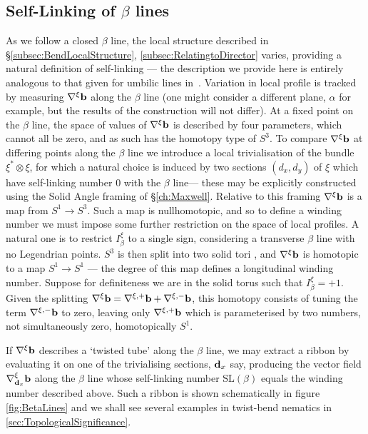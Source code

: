 {\subsection{Self-Linking of $\beta$ lines}
\label{subsec:Self-Linking}
As we follow a closed $\beta$ line, the local structure described in \S\ref{subsec:BendLocalStructure}, \ref{subsec:RelatingtoDirector} varies, providing a natural definition of self-linking --- the description we provide here is entirely analogous to that given for umbilic lines in~\citep{Machon2016b}. Variation in local profile is tracked by measuring $\nabla^\xi \mathbf{b}$ along the $\beta$ line (one might consider a different plane, $\alpha$ for example, but the results of the construction will not differ). At a fixed point on the $\beta$ line, the space of values of $\nabla^\xi \mathbf{b}$ is described by four parameters, which cannot all be zero, and as such has the homotopy type of $S^3$. To compare $\nabla^\xi \mathbf{b}$ at differing points along the $\beta$ line we introduce a local trivialisation of the bundle $\xi^*\otimes\xi$, for which a natural choice is induced by two sections $(d_x,d_y)$ of $\xi$ which have self-linking number $0$ with the $\beta$ line--- these may be explicitly constructed using the Solid Angle framing of \S\ref{ch:Maxwell}. Relative to this framing $\nabla^\xi \mathbf{b}$ is a map from $S^1 \rightarrow S^3$. Such a map is nullhomotopic, and so to define a winding number we must impose some further restriction on the space of local profiles. A natural one is to restrict $I_\beta^\xi$ to a single sign, considering a transverse $\beta$ line with no Legendrian points. $S^3$ is then split into two solid tori \citep{Machon2016b}, and $\nabla^\xi \mathbf{b}$ is homotopic to a map $S^1 \rightarrow S^1$ --- the degree of this map defines a longitudinal winding number. Suppose for definiteness we are in the solid torus such that $I^\xi_\beta= +1$. Given the splitting $\nabla^\xi \mathbf{b} =  \nabla^{\xi,+}\mathbf{b} +\nabla^{\xi,-}\mathbf{b}$, this homotopy consists of tuning the term $\nabla^{\xi,-}\mathbf{b}$ to zero, leaving only $\nabla^{\xi,+}\mathbf{b}$ which is parameterised by two numbers, not simultaneously zero, homotopically $S^1$.

If $\nabla^\xi \mathbf{b}$ describes a `twisted tube' along the $\beta$ line, we may extract a ribbon by evaluating it on one of the trivialising sections, $\mathbf{d}_x$ say, producing the vector field $\nabla^\xi_{\mathbf{d}_x} \mathbf{b}$ along the $\beta$ line whose self-linking number $\mathrm{SL}(\beta)$ equals the winding number described above. Such a ribbon is shown schematically in figure \ref{fig:BetaLines} and we shall see several examples in twist-bend nematics in \ref{sec:TopologicalSignificance}.
 
}
